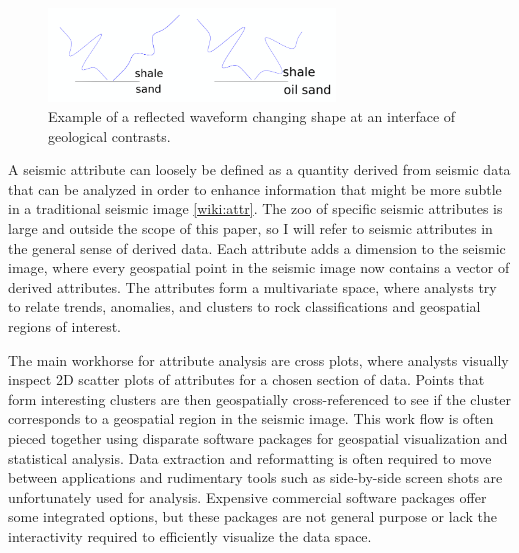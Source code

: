 \documentclass[journal]{vgtc}                %
\begin{document}
\begin{figure}[htb]
\centering
\includegraphics[width=3in]{signal_analysis}
\caption{Example of a reflected waveform changing shape at an interface of geological contrasts.}
\label{analysis}
\end{figure}

A seismic attribute can loosely be defined as a quantity derived from seismic data
that can be analyzed in order to enhance information that might be more subtle
in a traditional seismic image \ref{wiki:attr}. The zoo of specific seismic attributes is large and
outside the scope of this paper, so I will refer to seismic attributes in the general sense
of derived data. Each attribute adds a dimension to the seismic image, where every geospatial
point in the seismic image now contains a vector of derived attributes. The attributes form
a multivariate space, where analysts try to relate trends, anomalies, and clusters to
rock classifications and geospatial regions of interest.

The main workhorse for attribute analysis are cross plots, where analysts visually inspect
2D scatter plots of attributes for a chosen section of data. Points that form interesting clusters
are then geospatially cross-referenced to see if the cluster corresponds to a geospatial region in the seismic image.
This work flow is often pieced together using disparate software packages for geospatial visualization
and statistical analysis. Data extraction and reformatting is often required to move between applications
and rudimentary tools such as side-by-side screen shots are unfortunately used for analysis.
Expensive commercial software packages offer some integrated options, but these packages are not general
purpose or lack the interactivity required to efficiently visualize the data space.
\end{document}
